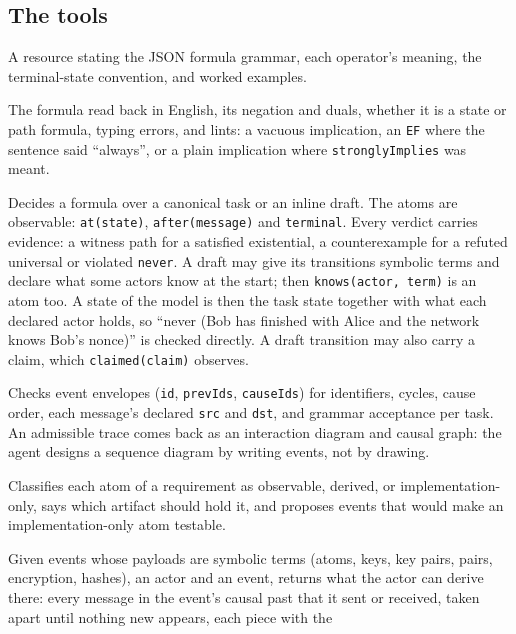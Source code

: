 \subsection{The tools}

\begin{description}[style=nextline]
\item[\texttt{leanfm://language/logic-reference}] A resource stating the JSON
formula grammar, each operator's meaning, the terminal-state convention, and
worked examples.
\item[\texttt{explain\_formula}] The formula read back in English, its negation
and duals, whether it is a state or path formula, typing errors, and lints: a
vacuous implication, an \texttt{EF} where the sentence said ``always'', or a
plain implication where \texttt{stronglyImplies} was meant.
\item[\texttt{check\_ctl}] Decides a formula over a canonical task or an inline
draft. The atoms are observable: \texttt{at(state)}, \texttt{after(message)} and
\texttt{terminal}. Every verdict carries evidence: a witness path for a
satisfied existential, a counterexample for a refuted universal or violated
\texttt{never}. A draft may give its transitions symbolic terms and declare what
some actors know at the start; then \texttt{knows(actor, term)} is an atom too.
A state of the model is then the task state together with what each declared
actor holds, so ``never (Bob has finished with Alice and the network knows Bob's
nonce)'' is checked directly. A draft transition may also carry a claim, which
\texttt{claimed(claim)} observes.
\item[\texttt{check\_trace}] Checks event envelopes (\texttt{id},
\texttt{prevIds}, \texttt{causeIds}) for identifiers, cycles, cause order, each
message's declared \texttt{src} and \texttt{dst}, and grammar acceptance per
task. An admissible trace comes back as an interaction diagram and causal graph:
the agent designs a sequence diagram by writing events, not by drawing.
\item[\texttt{classify\_requirement}] Classifies each atom of a requirement as
observable, derived, or implementation-only, says which artifact should hold it,
and proposes events that would make an implementation-only atom testable.
\item[\texttt{knows}] Given events whose payloads are symbolic terms (atoms,
keys, key pairs, pairs, encryption, hashes), an actor and an event, returns what
the actor can derive there: every message in the event's causal past that it
sent or received, taken apart until nothing new appears, each piece with the

\end{description}
